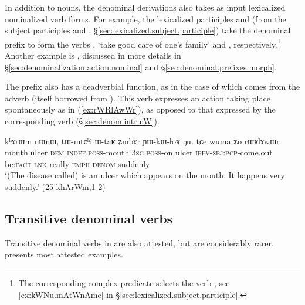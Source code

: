  
In addition to nouns, the  denominal derivations also takes as input lexicalized nominalized verb forms. For example, the lexicalized participles   and   (from the subject participles   and  , §\ref{sec:lexicalized.subject.participle}) take the  denominal prefix to form the verbs  , `take good care of one's family' and , respectively.\footnote{The corresponding complex predicate selects the verb , see \ref{ex:kWNu.mAtWnAme} in §\ref{sec:lexicalized.subject.participle}.} Another example is , discussed in more details in §\ref{sec:denominalization.action.nominal} and §\ref{sec:denominal.prefixes.morph}.
 
The  prefix also has a deadverbial function, as in the case of   which comes from the adverb  (itself borrowed from ). This verb expresses an action taking place spontaneously as in (\ref{ex:rWRlAwWr}), as opposed to that expressed by the corresponding  verb  (§\ref{sec:denom.intr.nW}).

\begin{exe}
\ex \label{ex:rWRlAwWr}
 \gll kʰɤrɯm nɯnɯ, tɯ-mtɕʰi ɯ-taʁ ʑmbɤr ɲɯ-kɯ-ɬoʁ ŋu. tɕe wuma ʑo rɯʁlɤwɯr    \\
mouth.ulcer \textsc{dem} \textsc{indef}.\textsc{poss}-mouth \textsc{3sg}.\textsc{poss}-on ulcer \textsc{ipfv}-\textsc{sbj}:\textsc{pcp}-come.out be:\textsc{fact} \textsc{lnk} really \textsc{emph} \textsc{denom}-suddenly  \\
\glt `(The disease called)  is an ulcer which appears on the mouth. It happens very suddenly.' (25-khArWm,1-2)
\end{exe}

\subsection{Transitive  denominal verbs}   \label{sec:denom.tr.rA}
Transitive denominal verbs in  are also attested, but are considerably rarer.  presents most attested examples.


